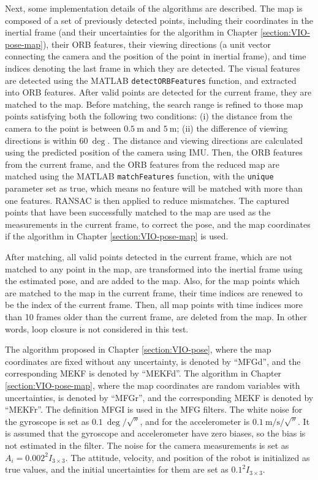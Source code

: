 Next, some implementation details of the algorithms are described.
The map is composed of a set of previously detected points, including their coordinates in the inertial frame (and their uncertainties for the algorithm in Chapter \ref{section:VIO-pose-map}), their ORB features, their viewing directions (a unit vector connecting the camera and the position of the point in inertial frame), and time indices denoting the last frame in which they are detected.
The visual features are detected using the MATLAB \texttt{detectORBFeatures} function, and extracted into ORB features.
After valid points are detected for the current frame, they are matched
to the map.
Before matching, the search range is refined to those map points satisfying both the following two conditions:
(i) the distance from the camera to the point is between $\SI{0.5}{\meter}$ and $\SI{5}{\meter}$; (ii) the difference of viewing directions is within
$\SI{60}{\deg}$.
The distance and viewing directions are calculated using the predicted position of the camera using IMU.
Then, the ORB features from the current frame, and the ORB features from the reduced map are matched using the MATLAB \texttt{matchFeatures} function, with the \texttt{unique} parameter set as true, which means no feature will be matched with more than one features.
RANSAC is then applied to reduce mismatches.
The captured points that have been successfully matched to the map are used as the measurements in the current frame, to correct the pose, and the map coordinates if the algorithm in Chapter \ref{section:VIO-pose-map} is used.

After matching, all valid points detected in the current frame, which are not matched to any point in the map, are transformed into the inertial frame using the estimated pose, and are added to the map.
Also, for the map points which are matched to the map in the current frame, their time indices are renewed to be the index of the current frame.
Then, all map points with time indices more than 10 frames older than the current frame, are deleted from the map.
In other words, loop closure is not considered in this test.

The algorithm proposed in Chapter \ref{section:VIO-pose}, where the map coordinates are fixed without any uncertainty, is denoted by ``MFGd'', and the corresponding MEKF is denoted by ``MEKFd''.
The algorithm in Chapter \ref{section:VIO-pose-map}, where the map coordinates are random variables with uncertainties, is denoted by ``MFGr'', and the corresponding MEKF is denoted by ``MEKFr''.
The definition MFGI is used in the MFG filters.
The white noise for the gyroscope is set as $\SI{0.1}{\deg/\sqrt{\second}}$, and for the accelerometer is $\SI{0.1}{\meter/\second/\sqrt{\second}}$.
It is assumed that the gyroscope and accelerometer have zero biases, so the bias is not estimated in the filter.
The noise for the camera measurements is set as $A_i = 0.002^2I_{3\times 3}$.
The attitude, velocity, and position of the robot is initialized as true values, and the initial uncertainties for them are set as $0.1^2I_{3\times 3}$.

